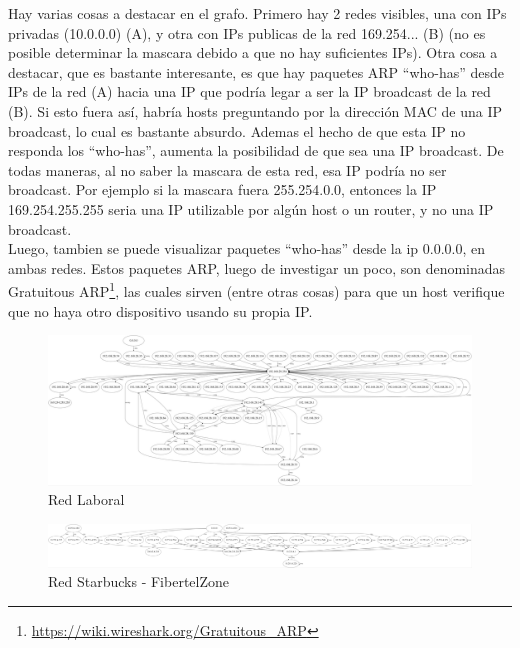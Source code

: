 Hay varias cosas a destacar en el grafo. Primero hay 2 redes visibles, una con IPs privadas (10.0.0.0) (A), y otra con IPs publicas de la red 169.254... (B) (no es posible determinar la mascara debido a que no hay suficientes IPs). Otra cosa a destacar, que es bastante interesante, es que hay paquetes ARP ``who-has'' desde IPs de la red (A) hacia una IP que podría legar a ser la IP broadcast de la red (B). Si esto fuera así, habría hosts preguntando por la dirección MAC de una IP broadcast, lo cual es bastante absurdo. Ademas el hecho de que esta IP no responda los ``who-has'', aumenta la posibilidad de que sea una IP broadcast. De todas maneras, al no saber la mascara de esta red, esa IP podría no ser broadcast. Por ejemplo si la mascara fuera 255.254.0.0, entonces la IP 169.254.255.255 seria una IP utilizable por algún host o un router, y no una IP broadcast.\\

Luego, tambien se puede visualizar paquetes ``who-has'' desde la ip 0.0.0.0, en ambas redes. Estos paquetes ARP, luego de investigar un poco, son denominadas Gratuitous ARP\footnote{\url{https://wiki.wireshark.org/Gratuitous_ARP}}, las cuales sirven (entre otras cosas) para que un host verifique que no haya otro dispositivo usando su propia IP.



\begin{figure}[h!]
  \begin{center}
      \includegraphics[width=270mm,angle=270]{graficos/grafo-baufest.jpg}
	\caption{Red Laboral}
    \label{fig:bf-graph}  
  \end{center}
\end{figure}

\begin{figure}[h!]
  \begin{center}
    \includegraphics[width=270mm,angle=270]{graficos/grafo-starbucks.jpg}
	\caption{Red Starbucks - FibertelZone}
    \label{fig:satrbucks-graph}  
  \end{center}
\end{figure}

